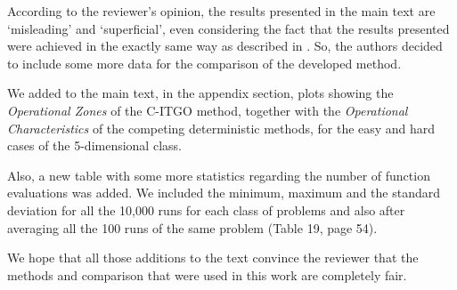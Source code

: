 \begin{revAns}
According to the reviewer's opinion, the results presented in the main text are `misleading' and `superficial', even considering the fact that the results presented were achieved in the exactly same way as described in \cite{NAT}. So, the authors decided to include some more data for the comparison of the developed method.

We added to the main text, in the appendix section, plots showing the \textit{Operational Zones} of the C-ITGO method, together with the \textit{Operational Characteristics} of the competing deterministic methods, for the easy and hard cases of the 5-dimensional class. 

Also, a new table with some more statistics regarding the number of function evaluations was added. We included the minimum, maximum and the standard deviation for all the 10,000 runs for each class of problems and also after averaging all the 100 runs of the same problem (Table 19, page 54).


We hope that all those additions to the text convince the reviewer that the methods and comparison that were used in this work are completely fair.



\end{revAns}